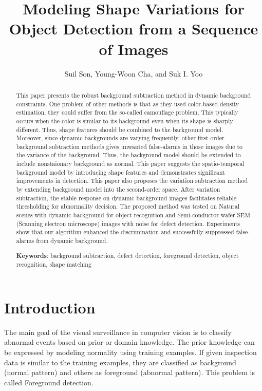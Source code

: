 \documentclass[conference]{IEEEtran}
\begin{document}
\title{Modeling Shape Variations for Object Detection from a Sequence of Images}
\author{Suil Son, Young-Woon Cha, and Suk I. Yoo}

\maketitle

\begin{abstract}
This paper presents the robust background subtraction method in dynamic background constraints. 
One problem of other methods is that as they used color-based density estimation, they could suffer from the so-called camouflage problem. This typically occurs when the color is similar to its background even when its shape is sharply different. Thus, shape features should be combined to the background model.
Moreover, since dynamic backgrounds are varying frequently, other first-order background subtraction methods gives unwanted false-alarms in those images due to the variance of the background. Thus, the background model should be extended to include nonstaionary background as normal.
This paper suggests the spatio-temporal background model by introducing shape features and demonstrates significant improvements in detection. This paper also proposes the variation subtraction method by extending background model into the second-order space. After variation subtraction, the stable response on dynamic background images facilitates reliable thresholding for abnormality decision.
The proposed method was tested on Natural scenes with dynamic background for object recognition and Semi-conductor wafer SEM (Scanning electron microscope) images with noise for defect detection. Experiments show that our algorithm enhanced the discrimination and successfully suppressed false-alarms from dynamic background.

\textbf{Keywords}: background subtraction, defect detection, foreground detection, object recognition, shape matching

\end{abstract}



\section{Introduction}
The main goal of the visual surveillance in computer vision is to classify abnormal events based on prior or domain knowledge. The prior knowledge can be expressed by modeling normality using training examples. If given inspection data is similar to the training examples, they are classified as background (normal pattern) and others as foreground (abnormal pattern). This problem is called Foreground detection.
\end{document}
